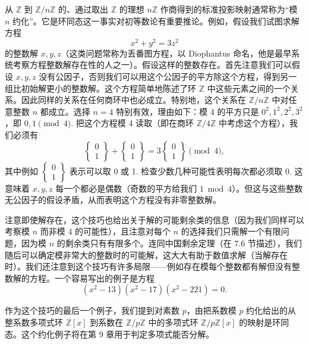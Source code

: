\begin{example}[约化同态]
从 \(\mathbb{Z}\) 到 \(\mathbb{Z}/n\mathbb{Z}\) 的、通过取出 \(\mathbb{Z}\) 的理想 \(n\mathbb{Z}\) 作商得到的标准投影映射通常称为“模 \(n\) 约化”。它是环同态这一事实对初等数论有重要推论。例如，假设我们试图求解方程
\[
x^2 + y^2 = 3z^2
\]
的整数解 \(x, y, z\)（这类问题常称为丢番图方程，以 Diophantus 命名，他是最早系统考察方程整数解存在性的人之一）。假设这样的整数存在。首先注意我们可以假设 \(x, y, z\) 没有公因子，否则我们可以用这个公因子的平方除这个方程，得到另一组比初始解更小的整数解。这个方程简单地陈述了环 \(\mathbb{Z}\) 中这些元素之间的一个关系。因此同样的关系在任何商环中也必成立。特别地，这个关系在 \(\mathbb{Z}/n\mathbb{Z}\) 中对任意整数 \(n\) 都成立。选择 \(n = 4\) 特别有效，理由如下：模 4 的平方只是 \(0^2, 1^2, 2^2, 3^2\)，即 \(0, 1 \pmod 4\). 把这个方程模 4 读取（即在商环 \(\mathbb{Z}/4\mathbb{Z}\) 中考虑这个方程），我们必须有
\[
\left\{\begin{smallmatrix}0\\1\end{smallmatrix}\right\} + \left\{\begin{smallmatrix}0\\1\end{smallmatrix}\right\} = 3\left\{\begin{smallmatrix}0\\1\end{smallmatrix}\right\} \pmod 4,
\]
其中例如 \(\left\{\begin{smallmatrix}0\\1\end{smallmatrix}\right\}\) 表示可以取 0 或 1. 检查少数几种可能性表明每次都必须取 0. 这意味着 \(x, y, z\) 每一个都必是偶数（奇数的平方给我们 \(1 \bmod 4\)）。但这与这些整数无公因子的假设矛盾，从而表明这个方程没有非零整数解。

注意即使解存在，这个技巧也给出关于解的可能剩余类的信息（因为我们同样可以考察模 \(n\) 而非模 4 的可能性），且注意对每个 \(n\) 的选择我们只需解一个有限问题，因为模 \(n\) 的剩余类只有有限多个。连同中国剩余定理（在 7.6 节描述），我们随后可以确定模非常大的整数时的可能解，这大大有助于数值求解（当解存在时）。我们还注意到这个技巧有许多局限——例如存在模每个整数都有解但没有整数解的方程。一个容易写出的例子是方程
\[
(x^2 - 13)(x^2 - 17)(x^2 - 221) = 0.
\]

作为这个技巧的最后一个例子，我们提到对素数 \(p\)，由把系数模 \(p\) 约化给出的从整系数多项式环 \(\mathbb{Z}[x]\) 到系数在 \(\mathbb{Z}/p\mathbb{Z}\) 中的多项式环 \(\mathbb{Z}/p\mathbb{Z}[x]\) 的映射是环同态。这个约化例子将在第 9 章用于判定多项式能否分解。
\end{example}

